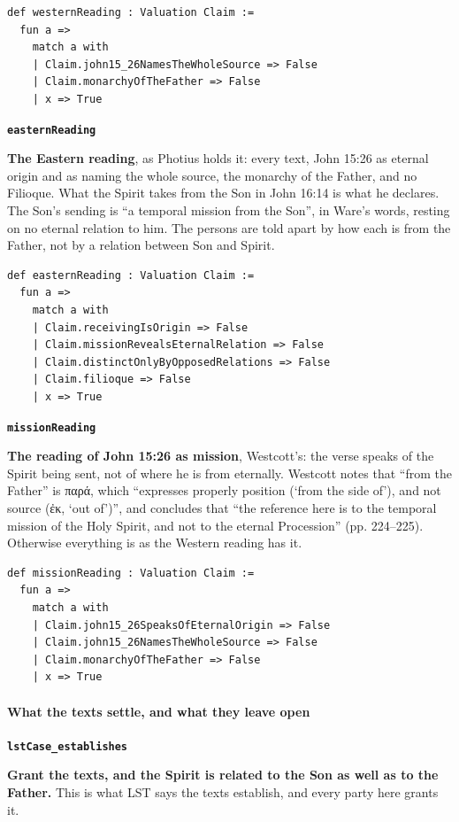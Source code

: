 \documentclass[11pt,paper=\testimonypaper,DIV=13,parskip=false]{scrartcl}
\begin{document}
{\small\begin{verbatim}
def westernReading : Valuation Claim :=
  fun a =>
    match a with
    | Claim.john15_26NamesTheWholeSource => False
    | Claim.monarchyOfTheFather => False
    | x => True
\end{verbatim}}
\par\medskip\noindent\textbf{\texttt{eastern\allowbreak{}Reading}}\par\nobreak\noindent
\textbf{The Eastern reading}, as Photius holds it: every text, John 15:26 as eternal origin and as naming the whole source, the monarchy of the Father, and no Filioque. What the Spirit takes from the Son in John 16:14 is what he declares. The Son’s sending is “a temporal mission from the Son”, in Ware’s words, resting on no eternal relation to him. The persons are told apart by how each is from the Father, not by a relation between Son and Spirit.

{\small\begin{verbatim}
def easternReading : Valuation Claim :=
  fun a =>
    match a with
    | Claim.receivingIsOrigin => False
    | Claim.missionRevealsEternalRelation => False
    | Claim.distinctOnlyByOpposedRelations => False
    | Claim.filioque => False
    | x => True
\end{verbatim}}
\par\medskip\noindent\textbf{\texttt{mission\allowbreak{}Reading}}\par\nobreak\noindent
\textbf{The reading of John 15:26 as mission}, Westcott’s: the verse speaks of the Spirit being sent, not of where he is from eternally. Westcott notes that “from the Father” is παρά, which “expresses properly position (‘from the side of’), and not source (ἐκ, ‘out of’)”, and concludes that “the reference here is to the temporal mission of the Holy Spirit, and not to the eternal Procession” (pp. 224–225). Otherwise everything is as the Western reading has it.

{\small\begin{verbatim}
def missionReading : Valuation Claim :=
  fun a =>
    match a with
    | Claim.john15_26SpeaksOfEternalOrigin => False
    | Claim.john15_26NamesTheWholeSource => False
    | Claim.monarchyOfTheFather => False
    | x => True
\end{verbatim}}
\paragraph*{What the texts settle, and what they leave open}
\leavevmode\par\nobreak
\par\medskip\noindent\textbf{\texttt{lst\allowbreak{}Case\_\allowbreak{}establishes}}\par\nobreak\noindent
\textbf{Grant the texts, and the Spirit is related to the Son as well as to the Father.} This is what LST says the texts establish, and every party here grants it.
\end{document}
